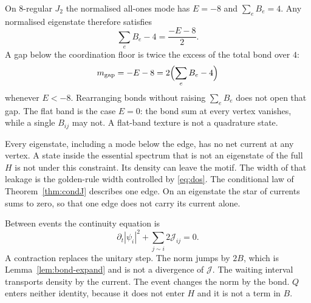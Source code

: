 On \(8\)-regular \(J_2\) the normalised all-ones mode has \(E=-8\) and
\(\sum_e B_e=4\).
Any normalised eigenstate therefore satisfies
\[
\sum_e B_e-4=\frac{-E-8}{2}.
\]
A gap below the coordination floor is twice the excess of the total bond
over \(4\):
\[
m_{\mathrm{gap}}=-E-8=2\Bigl(\sum_e B_e-4\Bigr)
\]
whenever \(E<-8\).
Rearranging bonds without raising \(\sum_e B_e\) does not open that gap.
The flat band is the case \(E=0\): the bond sum at every vertex vanishes,
while a single \(B_{ij}\) may not.
A flat-band texture is not a quadrature state.

Every eigenstate, including a mode below the edge, has no net current at
any vertex.
A state inside the essential spectrum that is not an eigenstate of the
full \(H\) is not under this constraint.
Its density can leave the motif.
The width of that leakage is the golden-rule width controlled by
\eqref{eq:dos}.
The conditional law of Theorem~\ref{thm:condJ} describes one edge.
On an eigenstate the star of currents sums to zero, so that one edge does
not carry its current alone.

Between events the continuity equation is
\[
\partial_t|\psi_i|^2+\sum_{j\sim i}2\mathcal{J}_{ij}=0.
\]
A contraction replaces the unitary step.
The norm jumps by \(2B\), which is Lemma~\ref{lem:bond-expand} and is not
a divergence of \(\mathcal{J}\).
The waiting interval transports density by the current.
The event changes the norm by the bond.
\(Q\) enters neither identity, because it does not enter \(H\) and it is
not a term in \(B\).


